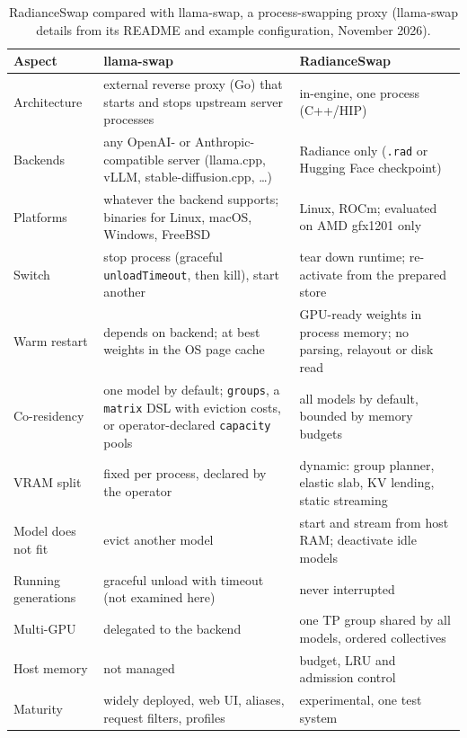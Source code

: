 \documentclass[10pt,conference,a4paper]{IEEEtran}
\newcommand{\code}[1]{\texttt{#1}}
\begin{document}
\begin{table}[t]
\caption{RadianceSwap compared with llama-swap, a process-swapping proxy (llama-swap details from its README and example configuration, November 2026).}
\label{tab:llamaswap}
\centering\footnotesize
\renewcommand{\arraystretch}{1.15}
\begin{tabular}{@{}p{3.0cm}p{6.6cm}p{6.6cm}@{}}
\toprule
Aspect & llama-swap~\cite{llamaswap} & RadianceSwap \\
\midrule
Architecture & external reverse proxy (Go) that starts and stops upstream server processes & in-engine, one process (C++/HIP) \\
Backends & any OpenAI- or Anthropic-compatible server (llama.cpp, vLLM, stable-diffusion.cpp, \dots) & Radiance only (\code{.rad} or Hugging Face checkpoint) \\
Platforms & whatever the backend supports; binaries for Linux, macOS, Windows, FreeBSD & Linux, ROCm; evaluated on AMD gfx1201 only \\
Switch & stop process (graceful \code{unloadTimeout}, then kill), start another & tear down runtime; re-activate from the prepared store \\
Warm restart & depends on backend; at best weights in the OS page cache & GPU-ready weights in process memory; no parsing, relayout or disk read \\
Co-residency & one model by default; \code{groups}, a \code{matrix} DSL with eviction costs, or operator-declared \code{capacity} pools & all models by default, bounded by memory budgets \\
VRAM split & fixed per process, declared by the operator & dynamic: group planner, elastic slab, KV lending, static streaming \\
Model does not fit & evict another model & start and stream from host RAM; deactivate idle models \\
Running generations & graceful unload with timeout (not examined here) & never interrupted \\
Multi-GPU & delegated to the backend & one TP group shared by all models, ordered collectives \\
Host memory & not managed & budget, LRU and admission control \\
Maturity & widely deployed, web UI, aliases, request filters, profiles & experimental, one test system \\
\bottomrule
\end{tabular}
\end{table}
\end{document}
